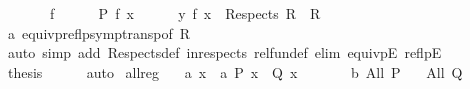 \begin{isabellebody}
%
\isadelimproof
%
\endisadelimproof
%
\isatagproof
{}\isamarkupfalse%
\ {\isacharminus}{\kern0pt}\isanewline
\ \ \isacommand{{\isacharbraceleft}{\kern0pt}}\isamarkupfalse%
\ \isamarkupfalse%
\ f\isanewline
\ \ \ \ \isamarkupfalse%
\ {\isachardoublequoteopen}P\ {\isacharparenleft}{\kern0pt}f\ x{\isacharparenright}{\kern0pt}{\isachardoublequoteclose}\isanewline
\ \ \ \ \isamarkupfalse%
\ {\isachardoublequoteopen}{\isacharparenleft}{\kern0pt}{\isasymlambda}y{\isachardot}{\kern0pt}\ f\ x{\isacharparenright}{\kern0pt}\ {\isasymin}\ Respects\ {\isacharparenleft}{\kern0pt}R{}\ {\isacharequal}{\kern0pt}{\isacharequal}{\kern0pt}{\isacharequal}{\kern0pt}{\isachargreater}{\kern0pt}\ R{}{\isacharparenright}{\kern0pt}{\isachardoublequoteclose}\isanewline
\ \ \ \ \ \ \isamarkupfalse%
\ a\ equivp{\isacharunderscore}{\kern0pt}reflp{\isacharunderscore}{\kern0pt}symp{\isacharunderscore}{\kern0pt}transp{\isacharbrackleft}{\kern0pt}of\ {\isachardoublequoteopen}R{}{\isachardoublequoteclose}{\isacharbrackright}{\kern0pt}\isanewline
\ \ \ \ \ \ \isamarkupfalse%
\ {\isacharparenleft}{\kern0pt}auto\ simp\ add{\isacharcolon}{\kern0pt}\ Respects{\isacharunderscore}{\kern0pt}def\ in{\isacharunderscore}{\kern0pt}respects\ rel{\isacharunderscore}{\kern0pt}fun{\isacharunderscore}{\kern0pt}def\ elim{\isacharcolon}{\kern0pt}\ equivpE\ reflpE{\isacharparenright}{\kern0pt}\ \isacommand{{\isacharbraceright}{\kern0pt}}\isamarkupfalse%
\isanewline
\ \ \isamarkupfalse%
\ \isamarkupfalse%
\ {\isacharquery}{\kern0pt}thesis\isanewline
\ \ \ \ \isamarkupfalse%
\ auto\isanewline
{}\isamarkupfalse%
%
\endisatagproof
{\isafoldproof}%
%
\isadelimproof
\isanewline
%
\endisadelimproof
\isanewline
\isanewline
{}\isamarkupfalse%
\ all{\isacharunderscore}{\kern0pt}reg{\isacharcolon}{\kern0pt}\isanewline
\ \ \ a{\isacharcolon}{\kern0pt}\ {\isachardoublequoteopen}{\isasymforall}x\ {\isacharcolon}{\kern0pt}{\isacharcolon}{\kern0pt}\ {\isacharprime}{\kern0pt}a{\isachardot}{\kern0pt}\ {\isacharparenleft}{\kern0pt}P\ x\ {\isasymlongrightarrow}\ Q\ x{\isacharparenright}{\kern0pt}{\isachardoublequoteclose}\isanewline
\ \ \ \ \ \ \ b{\isacharcolon}{\kern0pt}\ {\isachardoublequoteopen}All\ P{\isachardoublequoteclose}\isanewline
\ \ \ {\isachardoublequoteopen}All\ Q{\isachardoublequoteclose}\isanewline
%
\isadelimproof
\ \ %
\endisadelimproof
%
\isatagproof

\end{isabellebody}
